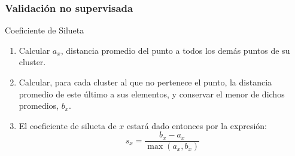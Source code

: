 \begin{frame}
    \frametitle{Validación no supervisada}

    \begin{block}{Coeficiente de Silueta}
        \begin{enumerate}
            \item<2-> Calcular $a_x$, distancia promedio del punto a todos los demás puntos de su cluster.
            \item<3-> Calcular, para cada cluster al que no pertenece el punto, la distancia promedio de este último a sus elementos, y conservar el menor de dichos promedios, $b_x$.
            \item<4-> El coeficiente de silueta de $x$ estará dado entonces por la expresión:
            \begin{equation*}
                s_x = \frac{b_x - a_x}{\max{(a_x, b_x)}}
            \end{equation*}
        \end{enumerate}
    \end{block}

\end{frame}